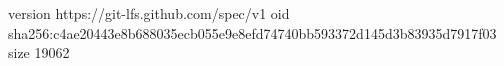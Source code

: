 version https://git-lfs.github.com/spec/v1
oid sha256:c4ae20443e8b688035ecb055e9e8efd74740bb593372d145d3b83935d7917f03
size 19062
